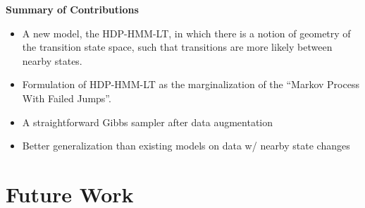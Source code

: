 \documentclass[11pt, mathserif, handout, table]{beamer}
\begin{document}
\begin{frame}
  \begin{exampleblock}{\small
      {\bf Summary of Contributions}
\vspace{0.2in}

    \begin{itemize}
      \item A new model, the HDP-HMM-LT, in which there is a
        notion of geometry of the transition state space, such that
        transitions are more likely between nearby states.
      \item Formulation of HDP-HMM-LT as the marginalization of
        the ``Markov Process With Failed Jumps''.
      \item A straightforward Gibbs sampler after data augmentation
      \item Better generalization than existing models on data w/
        nearby state changes
    \end{itemize}
}
\end{exampleblock}
\end{frame}

\section{Future Work}
\label{sec:future-work}
\end{document}
